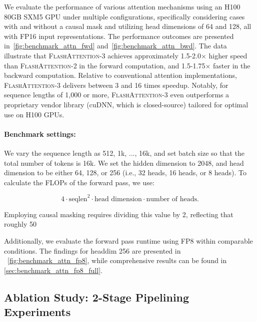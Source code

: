 \begin{enumerate}
\begin{itemize}
We evaluate the performance of various attention mechanisms using an H100 80GB SXM5 GPU under multiple configurations, specifically considering cases with and without a causal mask and utilizing head dimensions of 64 and 128, all with FP16 input representations. The performance outcomes are presented in~\cref{fig:benchmark_attn_fwd} and~\cref{fig:benchmark_attn_bwd}. The data illustrate that \textsc{FlashAttention-3} achieves approximately 1.5-2.0$\times$ higher speed than \textsc{FlashAttention-2} in the forward computation, and 1.5-1.75$\times$ faster in the backward computation. Relative to conventional attention implementations, \textsc{FlashAttention-3} delivers between 3 and 16 times speedup. Notably, for sequence lengths of 1,000 or more, \textsc{FlashAttention-3} even outperforms a proprietary vendor library (cuDNN, which is closed-source) tailored for optimal use on H100 GPUs.

\paragraph{Benchmark settings:} We vary the sequence length as 512, 1k, ..., 16k, and set batch size so that the total number of tokens is 16k. We set the hidden dimension to 2048, and head dimension to be either 64, 128, or 256 (i.e., 32 heads, 16 heads, or 8 heads). To calculate the FLOPs of the forward pass, we use:

\begin{equation*}
  4 \cdot \text{seqlen}^2 \cdot \text{head dimension} \cdot \text{number of heads}.
\end{equation*}

Employing causal masking requires dividing this value by 2, reflecting that roughly 50%

Additionally, we evaluate the forward pass runtime using FP8 within comparable conditions. The findings for headdim 256 are presented in ~\cref{fig:benchmark_attn_fp8}, while comprehensive results can be found in \cref{sec:benchmark_attn_fp8_full}.

\subsection{Ablation Study: 2-Stage Pipelining Experiments}
\label{sec:2-stage-pipelining-experiments}


\end{itemize}
\end{enumerate}
